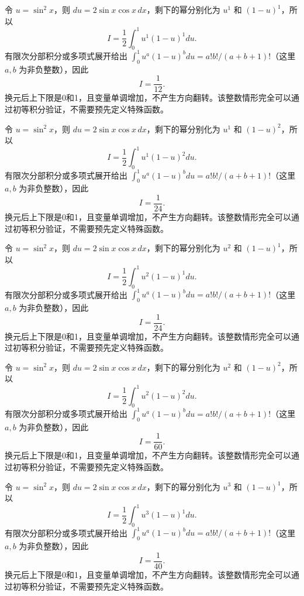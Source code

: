 \documentclass[UTF8,12pt,a4paper,fontset=fandol]{ctexart}
\begin{document}
\begin{solve}\label{ans:c16q19}
令 $u=\sin^2x$，则 $du=2\sin x\cos x\,dx$，剩下的幂分别化为 $u^{1}$ 和 $(1-u)^{1}$，所以
\[
I=\frac12\int_0^1u^{1}(1-u)^{1}du.
\]
有限次分部积分或多项式展开给出 $\int_0^1u^a(1-u)^bdu=a!b!/(a+b+1)!$（这里 $a,b$ 为非负整数），因此
\[
I=\frac{1}{12}.
\]
换元后上下限是0和1，且变量单调增加，不产生方向翻转。该整数情形完全可以通过初等积分验证，不需要预先定义特殊函数。
\end{solve}

\begin{solve}\label{ans:c16q20}
令 $u=\sin^2x$，则 $du=2\sin x\cos x\,dx$，剩下的幂分别化为 $u^{1}$ 和 $(1-u)^{2}$，所以
\[
I=\frac12\int_0^1u^{1}(1-u)^{2}du.
\]
有限次分部积分或多项式展开给出 $\int_0^1u^a(1-u)^bdu=a!b!/(a+b+1)!$（这里 $a,b$ 为非负整数），因此
\[
I=\frac{1}{24}.
\]
换元后上下限是0和1，且变量单调增加，不产生方向翻转。该整数情形完全可以通过初等积分验证，不需要预先定义特殊函数。
\end{solve}

\begin{solve}\label{ans:c16q21}
令 $u=\sin^2x$，则 $du=2\sin x\cos x\,dx$，剩下的幂分别化为 $u^{2}$ 和 $(1-u)^{1}$，所以
\[
I=\frac12\int_0^1u^{2}(1-u)^{1}du.
\]
有限次分部积分或多项式展开给出 $\int_0^1u^a(1-u)^bdu=a!b!/(a+b+1)!$（这里 $a,b$ 为非负整数），因此
\[
I=\frac{1}{24}.
\]
换元后上下限是0和1，且变量单调增加，不产生方向翻转。该整数情形完全可以通过初等积分验证，不需要预先定义特殊函数。
\end{solve}

\begin{solve}\label{ans:c16q22}
令 $u=\sin^2x$，则 $du=2\sin x\cos x\,dx$，剩下的幂分别化为 $u^{2}$ 和 $(1-u)^{2}$，所以
\[
I=\frac12\int_0^1u^{2}(1-u)^{2}du.
\]
有限次分部积分或多项式展开给出 $\int_0^1u^a(1-u)^bdu=a!b!/(a+b+1)!$（这里 $a,b$ 为非负整数），因此
\[
I=\frac{1}{60}.
\]
换元后上下限是0和1，且变量单调增加，不产生方向翻转。该整数情形完全可以通过初等积分验证，不需要预先定义特殊函数。
\end{solve}

\begin{solve}\label{ans:c16q23}
令 $u=\sin^2x$，则 $du=2\sin x\cos x\,dx$，剩下的幂分别化为 $u^{3}$ 和 $(1-u)^{1}$，所以
\[
I=\frac12\int_0^1u^{3}(1-u)^{1}du.
\]
有限次分部积分或多项式展开给出 $\int_0^1u^a(1-u)^bdu=a!b!/(a+b+1)!$（这里 $a,b$ 为非负整数），因此
\[
I=\frac{1}{40}.
\]
换元后上下限是0和1，且变量单调增加，不产生方向翻转。该整数情形完全可以通过初等积分验证，不需要预先定义特殊函数。
\end{solve}
\end{document}
